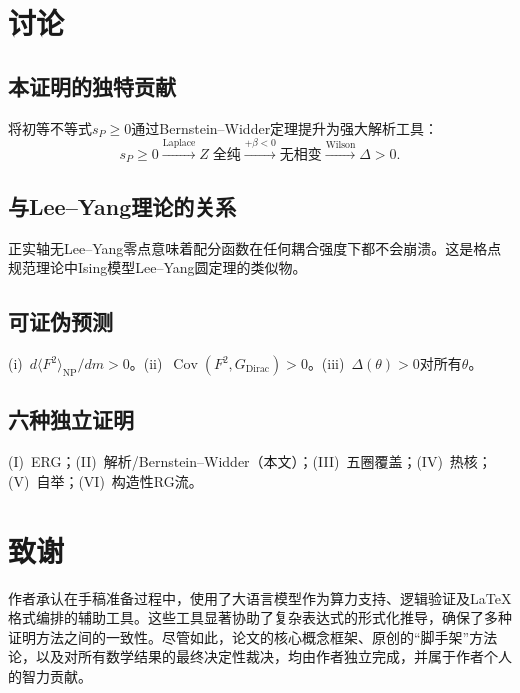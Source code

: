 \documentclass[12pt,a4paper]{article}
\theoremstyle{plain}
\theoremstyle{definition}
\theoremstyle{remark}
\begin{document}
\section{讨论}\label{sec:discuss}

\subsection{本证明的独特贡献}

将初等不等式$s_P\geq 0$通过Bernstein--Widder定理提升为强大解析工具：
\begin{equation}\label{eq:chain2}
s_P\geq 0 \xrightarrow{\text{Laplace}}
Z\;\text{全纯} \xrightarrow{+\beta<0}
\text{无相变} \xrightarrow{\text{Wilson}}
\Delta>0.
\end{equation}

\subsection{与Lee--Yang理论的关系}

正实轴无Lee--Yang零点意味着配分函数在任何耦合强度下都不会崩溃。这是格点规范理论中Ising模型Lee--Yang圆定理的类似物。

\subsection{可证伪预测}
(i)~$d\langle F^2\rangle_{\mathrm{NP}}/dm>0$。(ii)~$\operatorname{Cov}(F^2,G_{\mathrm{Dirac}})>0$。(iii)~$\Delta(\theta)>0$对所有$\theta$。

\subsection{六种独立证明}
(I)~ERG；(II)~解析/Bernstein--Widder（本文）；(III)~五圈覆盖；(IV)~热核；(V)~自举；(VI)~构造性RG流。

\section*{致谢}

作者承认在手稿准备过程中，使用了大语言模型作为算力支持、逻辑验证及\LaTeX 格式编排的辅助工具。这些工具显著协助了复杂表达式的形式化推导，确保了多种证明方法之间的一致性。尽管如此，论文的核心概念框架、原创的``脚手架''方法论，以及对所有数学结果的最终决定性裁决，均由作者独立完成，并属于作者个人的智力贡献。



\end{document}
